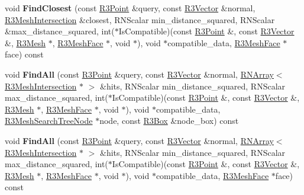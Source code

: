 \begin{DoxyCompactItemize}
\item 
void {\bfseries Find\+Closest} (const \hyperlink{class_r3_point}{R3\+Point} \&query, const \hyperlink{class_r3_vector}{R3\+Vector} \&normal, \hyperlink{struct_r3_mesh_intersection}{R3\+Mesh\+Intersection} \&closest, R\+N\+Scalar min\+\_\+distance\+\_\+squared, R\+N\+Scalar \&max\+\_\+distance\+\_\+squared, int($\ast$Is\+Compatible)(const \hyperlink{class_r3_point}{R3\+Point} \&, const \hyperlink{class_r3_vector}{R3\+Vector} \&, \hyperlink{class_r3_mesh}{R3\+Mesh} $\ast$, \hyperlink{class_r3_mesh_face}{R3\+Mesh\+Face} $\ast$, void $\ast$), void $\ast$compatible\+\_\+data, \hyperlink{class_r3_mesh_face}{R3\+Mesh\+Face} $\ast$face) const \hypertarget{class_r3_mesh_search_tree_adf9bd5b7c68fc0a19686ffed21cf1b5d}{}\label{class_r3_mesh_search_tree_adf9bd5b7c68fc0a19686ffed21cf1b5d}

\item 
void {\bfseries Find\+All} (const \hyperlink{class_r3_point}{R3\+Point} \&query, const \hyperlink{class_r3_vector}{R3\+Vector} \&normal, \hyperlink{class_r_n_array}{R\+N\+Array}$<$ \hyperlink{struct_r3_mesh_intersection}{R3\+Mesh\+Intersection} $\ast$ $>$ \&hits, R\+N\+Scalar min\+\_\+distance\+\_\+squared, R\+N\+Scalar max\+\_\+distance\+\_\+squared, int($\ast$Is\+Compatible)(const \hyperlink{class_r3_point}{R3\+Point} \&, const \hyperlink{class_r3_vector}{R3\+Vector} \&, \hyperlink{class_r3_mesh}{R3\+Mesh} $\ast$, \hyperlink{class_r3_mesh_face}{R3\+Mesh\+Face} $\ast$, void $\ast$), void $\ast$compatible\+\_\+data, \hyperlink{class_r3_mesh_search_tree_node}{R3\+Mesh\+Search\+Tree\+Node} $\ast$node, const \hyperlink{class_r3_box}{R3\+Box} \&node\+\_\+box) const \hypertarget{class_r3_mesh_search_tree_ae5ca53a22589df7786f45479ba933f4b}{}\label{class_r3_mesh_search_tree_ae5ca53a22589df7786f45479ba933f4b}

\item 
void {\bfseries Find\+All} (const \hyperlink{class_r3_point}{R3\+Point} \&query, const \hyperlink{class_r3_vector}{R3\+Vector} \&normal, \hyperlink{class_r_n_array}{R\+N\+Array}$<$ \hyperlink{struct_r3_mesh_intersection}{R3\+Mesh\+Intersection} $\ast$ $>$ \&hits, R\+N\+Scalar min\+\_\+distance\+\_\+squared, R\+N\+Scalar max\+\_\+distance\+\_\+squared, int($\ast$Is\+Compatible)(const \hyperlink{class_r3_point}{R3\+Point} \&, const \hyperlink{class_r3_vector}{R3\+Vector} \&, \hyperlink{class_r3_mesh}{R3\+Mesh} $\ast$, \hyperlink{class_r3_mesh_face}{R3\+Mesh\+Face} $\ast$, void $\ast$), void $\ast$compatible\+\_\+data, \hyperlink{class_r3_mesh_face}{R3\+Mesh\+Face} $\ast$face) const \hypertarget{class_r3_mesh_search_tree_a1a4b6d8e662f2f7ca4390253f80dab45}{}\label{class_r3_mesh_search_tree_a1a4b6d8e662f2f7ca4390253f80dab45}


\end{DoxyCompactItemize}
